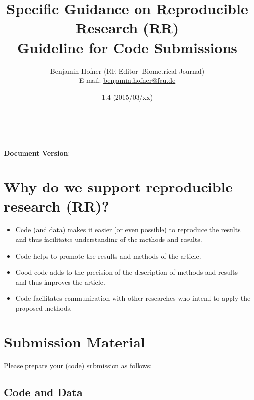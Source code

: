 \documentclass[12pt,a4paper]{article}
\title{%
  Specific Guidance on Reproducible Research (RR)\\[0.2em]
  \large Guideline for Code Submissions}
\author{Benjamin Hofner (RR Editor, Biometrical Journal)\\
  E-mail: \href{mailto:benjamin.hofner@fau.de}{benjamin.hofner@fau.de}}
\date{1.4 (2015/03/xx)}
\makeatletter
\renewcommand{\maketitle}{\bgroup\setlength{\parindent}{0pt}
  \begin{flushleft}
    \vspace*{10cm}
    \textbf{\Large \@title}\\[1em]

    \@author\\[0.5em]

    \textbf{Document Version:} \@date
    \vspace{2em}
  \end{flushleft}\egroup
}
\makeatother
\begin{document}
\maketitle


\tableofcontents

\newpage 

\setlength{\parskip}{0.2em}

\section*{Why do we support reproducible research (RR)?}
\begin{itemize}
\item Code (and data) makes it easier (or even possible) to reproduce the results
  and thus facilitates understanding of the methods and results.
\item Code helps to promote the results and methods of the article.
\item Good code adds to the precision of the description of methods and results
  and thus improves the article.
\item Code facilitates communication with other researches who intend to apply
  the proposed methods.
\end{itemize}

\setcounter{section}{0}

\section{Submission Material}

Please prepare your (code) submission as follows:

\subsection{Code and Data}
\end{document}
